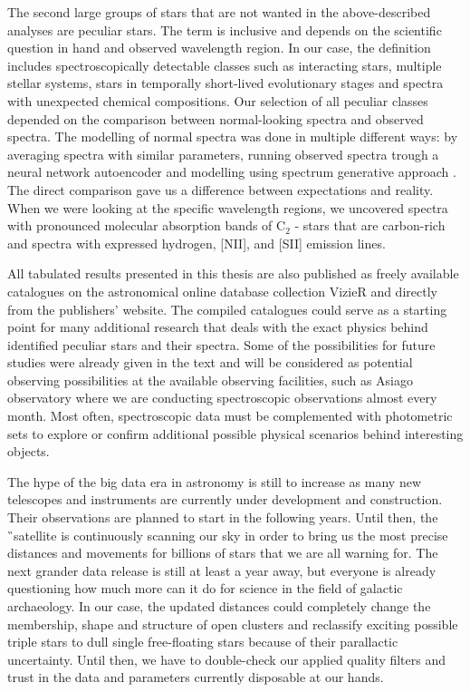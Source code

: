 The second large groups of stars that are not wanted in the above-described analyses are peculiar stars. The term is inclusive and depends on the scientific question in hand and observed wavelength region. In our case, the definition includes spectroscopically detectable classes such as interacting stars, multiple stellar systems, stars in temporally short-lived evolutionary stages and spectra with unexpected chemical compositions. Our selection of all peculiar classes depended on the comparison between normal-looking spectra and observed spectra. The modelling of normal spectra was done in multiple different ways: by averaging spectra with similar parameters, running observed spectra trough a neural network autoencoder and modelling using spectrum generative approach \TC. The direct comparison gave us a difference between expectations and reality. When we were looking at the specific wavelength regions, we uncovered spectra with pronounced molecular absorption bands of C$_2$ - stars that are carbon-rich and spectra with expressed hydrogen, [NII], and [SII] emission lines.

All tabulated results presented in this thesis are also published as freely available catalogues on the astronomical online database collection VizieR and directly from the publishers' website. The compiled catalogues could serve as a starting point for many additional research that deals with the exact physics behind identified peculiar stars and their spectra. Some of the possibilities for future studies were already given in the text and will be considered as potential observing possibilities at the available observing facilities, such as Asiago observatory where we are conducting spectroscopic observations almost every month. Most often, spectroscopic data must be complemented with photometric sets to explore or confirm additional possible physical scenarios behind interesting objects.

The hype of the big data era in astronomy is still to increase as many new telescopes and instruments are currently under development and construction. Their observations are planned to start in the following years. Until then, the \G\ satellite is continuously scanning our sky in order to bring us the most precise distances and movements for billions of stars that we are all warning for. The next grander data release is still at least a year away, but everyone is already questioning how much more can it do for science in the field of galactic archaeology. In our case, the updated distances could completely change the membership, shape and structure of open clusters and reclassify exciting possible triple stars to dull single free-floating stars because of their parallactic uncertainty. Until then, we have to double-check our applied quality filters and trust in the data and parameters currently disposable at our hands.